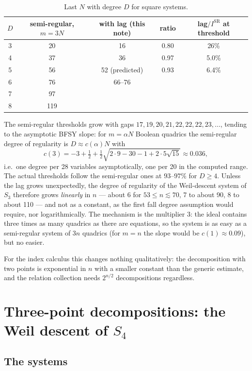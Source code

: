 \documentclass[11pt,a4paper]{article}
\theoremstyle{remark}\newtheorem{remark}{Remark}
\newcommand{\SR}{\mathrm{SR}}
\begin{document}
\begin{table}[ht]\centering\small
\caption{Last $N$ with degree $D$ for square systems.}\label{tab:thresholds}
\begin{tabular}{ccccc}
\toprule
$D$ & semi-regular, $m=3N$ & with lag (this note) & ratio & lag$/I^{\SR}$ at threshold\\
\midrule
3 & 20 & 16 & 0.80 & 26\%\\
4 & 37 & 36 & 0.97 & 5.0\%\\
5 & 56 & 52 (predicted) & 0.93 & 6.4\%\\
6 & 76 & 66--76 & & \\
7 & 97 & & & \\
8 & 119 & & & \\
\bottomrule
\end{tabular}
\end{table}

The semi-regular thresholds grow with gaps $17,19,20,21,22,22,22,23,\dots$, tending to the asymptotic BFSY slope: for $m=\alpha N$ Boolean quadrics the semi-regular degree of regularity is $D\approx c(\alpha)N$ with
\[
c(3)=-3+\tfrac12+\tfrac12\sqrt{2\cdot9-30-1+2\cdot5\sqrt{15}}\approx0.036,
\]
i.e.\ one degree per 28 variables asymptotically, one per 20 in the computed range. The actual thresholds follow the semi-regular ones at $93$--$97\%$ for $D\ge4$. Unless the lag grows unexpectedly, the degree of regularity of the Weil-descent system of $S_3$ therefore grows \emph{linearly} in $n$ --- about 6 for $53\le n\lesssim70$, 7 to about 90, 8 to about 110 --- and not as a constant, as the first fall degree assumption would require, nor logarithmically. The mechanism is the multiplier 3: the ideal contains three times as many quadrics as there are equations, so the system is as easy as a semi-regular system of $3n$ quadrics (for $m=n$ the slope would be $c(1)\approx0.09$), but no easier.

For the index calculus this changes nothing qualitatively: the decomposition with two points is exponential in $n$ with a smaller constant than the generic estimate, and the relation collection needs $2^{n/2}$ decompositions regardless.

\section{Three-point decompositions: the Weil descent of $S_4$}\label{sec:s4}

\subsection{The systems}
\end{document}
